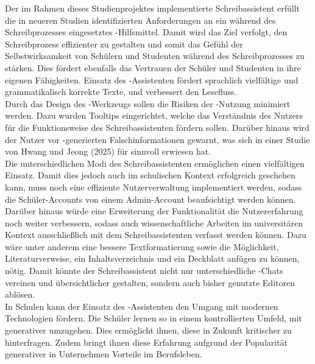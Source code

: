 \documentclass[../main.tex]{subfiles}
\begin{document}
Der im Rahmen dieses Studienprojektes implementierte Schreibassistent erfüllt die in neueren Studien identifizierten Anforderungen an ein während des Schreibprozesses eingesetztes 
-Hilfsmittel. Damit wird das Ziel verfolgt, den Schreibprozess effizienter zu gestalten und somit das Gefühl der Selbstwirksamkeit von Schülern und Studenten während des 
Schreibprozesses zu stärken. Dies fördert ebenfalls das Vertrauen der Schüler und Studenten in ihre eigenen Fähigkeiten. Einsatz des -Assistenten fördert sprachlich vielfältige 
und grammatikalisch korrekte Texte, und verbessert den Lesefluss. \\
Durch das Design des -Werkzeugs sollen die Risiken der -Nutzung minimiert werden. Dazu wurden Tooltips eingerichtet, welche das Verständnis des Nutzers für die Funktionsweise des 
Schreibassistenten fördern sollen. Darüber hinaus wird der Nutzer vor -generierten Falschinformationen gewarnt, was sich in einer Studie von Hwang und Jeong (2025) für sinnvoll 
erwiesen hat. \\
Die unterschiedlichen Modi des Schreibassistenten ermöglichen einen vielfältigen Einsatz. Damit dies jedoch auch im schulischen Kontext erfolgreich geschehen kann, muss noch eine 
effiziente Nutzerverwaltung implementiert werden, sodass die Schüler-Accounts von einem Admin-Account beaufsichtigt werden können.\\
Darüber hinaus würde eine Erweiterung der Funktionalität die Nutzererfahrung noch weiter verbessern, sodass auch wissenschaftliche Arbeiten im universitären Kontext ausschließlich 
mit dem Schreibassistenten verfasst werden können. Dazu wäre unter anderem eine bessere Textformatierung sowie die Möglichkeit, Literaturverweise, ein Inhaltsverzeichnis und ein 
Deckblatt anfügen zu können, nötig. Damit könnte der Schreibassistent nicht nur unterschiedliche -Chats vereinen und übersichtlicher gestalten, sondern auch bisher genutzte 
Editoren ablösen.\\
In Schulen kann der Einsatz des -Assistenten den Umgang mit modernen Technologien fördern. Die Schüler lernen so in einem kontrollierten Umfeld, mit generativer umzugehen. 
Dies ermöglicht ihnen, diese in Zukunft kritischer zu hinterfragen. Zudem bringt ihnen diese Erfahrung aufgrund der Popularität generativer  in Unternehmen Vorteile im Berufsleben.
\end{document}

